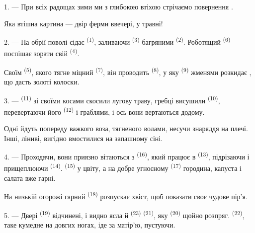 \VUsaut{3.0mm}
\VUsaut{3.0mm}

\VUsaut{4.0mm}

1. --- При всіх радощах зими ми з глибокою втіхою стрічаємо повернення
.

Яка втішна картина --- двір ферми ввечері, у травні!

2. --- На обрії поволі сідає  \textsuperscript{(1)}, заливаючи
 \textsuperscript{(3)} багряними 
\textsuperscript{(2)}. Роботящий  \textsuperscript{(6)} поспішає
зорати свій  \textsuperscript{(4)}.

Своїм  \textsuperscript{(5)}, якого тягне міцний 
\textsuperscript{(7)}, він проводить  \textsuperscript{(8)}, у
яку  \textsuperscript{(9)} жменями розкидає , що
дасть золоті колоски.

3. ---  \textsuperscript{(11)} зі своїми косами скосили лугову
траву, гребці висушили  \textsuperscript{(10)}, перевертаючи його
 \textsuperscript{(12)} і граблями, і ось вони вертаються додому.

Одні йдуть попереду важкого воза, тягненого волами, несучи знаряддя на плечі.
Інші, ліниві, вигідно вмостилися на запашному сіні.

4. --- Проходячи, вони приязно вітаються з 
\textsuperscript{(16)}, який працює в  \textsuperscript{(13)},
підрізаючи  і прищеплюючи 
\textsuperscript{(14)}.  \textsuperscript{(15)} у цвіту, а на добре
угноєному  \textsuperscript{(17)} городина, капуста і салата вже
гарні.

На низькій огорожі гарний  \textsuperscript{(18)} розпускає хвіст,
щоб показати своє чудове пір'я.

\VUsaut{3.0mm}

5. --- Двері  \textsuperscript{(19)} відчинені, і видно ясла й
 \textsuperscript{(23)}  \textsuperscript{(21)},
яку  \textsuperscript{(20)} щойно розпряг. 
\textsuperscript{(22)}, таке кумедне на довгих ногах, іде за матір'ю, пустуючи.

